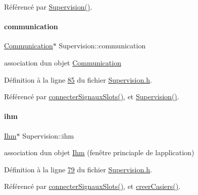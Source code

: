Référencé par \hyperlink{_supervision_8cpp_source_l00036}{Supervision()}.

\mbox{\label{class_supervision_a045be64d74de4f7688574eec108220a5}} 
\paragraph{\texorpdfstring{communication}{communication}}
{\footnotesize\ttfamily \hyperlink{class_communication}{Communication}$\ast$ Supervision\+::communication\hspace{0.3cm}{\ttfamily [private]}}



association d\textquotesingle{}un objet \hyperlink{class_communication}{Communication} 



Définition à la ligne \hyperlink{_supervision_8h_source_l00085}{85} du fichier \hyperlink{_supervision_8h_source}{Supervision.\+h}.



Référencé par \hyperlink{_supervision_8cpp_source_l00273}{connecter\+Signaux\+Slots()}, et \hyperlink{_supervision_8cpp_source_l00036}{Supervision()}.

\mbox{\label{class_supervision_a5aa823c55bf1531497bbb8fdbc6c5528}} 
\paragraph{\texorpdfstring{ihm}{ihm}}
{\footnotesize\ttfamily \hyperlink{class_ihm}{Ihm}$\ast$ Supervision\+::ihm\hspace{0.3cm}{\ttfamily [private]}}



association d\textquotesingle{}un objet \hyperlink{class_ihm}{Ihm} (fenêtre princiaple de l\textquotesingle{}application) 



Définition à la ligne \hyperlink{_supervision_8h_source_l00079}{79} du fichier \hyperlink{_supervision_8h_source}{Supervision.\+h}.



Référencé par \hyperlink{_supervision_8cpp_source_l00273}{connecter\+Signaux\+Slots()}, et \hyperlink{_supervision_8cpp_source_l00090}{creer\+Casiers()}.

